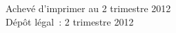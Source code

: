 \cleardoublepage
\mbox{}
\vfill

{\scriptsize
\begin{center}
Achevé d'imprimer au 2 trimestre 2012 \\
Dépôt légal~: 2 trimestre 2012
\end{center}
}
\enlargethispage{\footskip}


